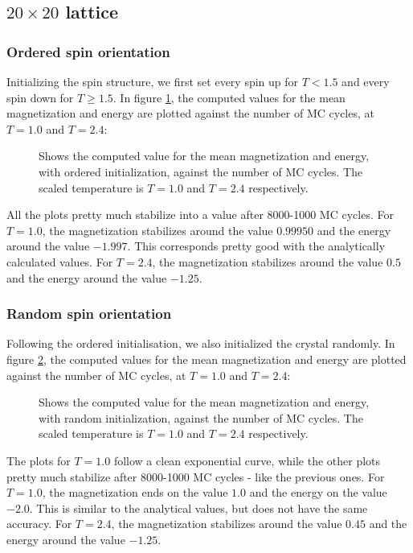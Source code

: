 \documentclass[../main.tex]{subfiles}
\begin{document}
\subsection{$20 \times 20$ lattice}
\subsubsection*{Ordered spin orientation}
Initializing the spin structure, we first set every spin up for $T<1.5$ and every spin down for $T\ge 1.5$. In figure \ref{fig:ordered}, the computed values for the mean magnetization and energy are plotted against the number of MC cycles, at $T=1.0$ and $T=2.4$:

\begin{figure}[!h]
  \centering
  \caption{Shows the computed value for the mean magnetization and energy, with ordered initialization, against the number of MC cycles. The scaled temperature is $T=1.0$ and $T=2.4$ respectively.}
  \label{fig:ordered}
\end{figure}
\FloatBarrier
All the plots pretty much stabilize into a value after 8000-1000 MC cycles. For $T=1.0$, the magnetization stabilizes around the value $0.99950$ and the energy around the value $-1.997$. This corresponds pretty good with the analytically calculated values. For $T=2.4$, the magnetization stabilizes around the value $0.5$ and the energy around the value $-1.25$.

\subsubsection*{Random spin orientation}
Following the ordered initialisation, we also initialized the crystal randomly. In figure \ref{fig:random}, the computed values for the mean magnetization and energy are plotted against the number of MC cycles, at $T=1.0$ and $T=2.4$:

\begin{figure}[!h]
  \centering
  \caption{Shows the computed value for the mean magnetization and energy, with random initialization, against the number of MC cycles. The scaled temperature is $T=1.0$ and $T=2.4$ respectively.}
  \label{fig:random}
\end{figure}
\FloatBarrier
The plots for $T=1.0$ follow a clean exponential curve, while the other plots pretty much stabilize after 8000-1000 MC cycles - like the previous ones. For $T=1.0$, the magnetization ends on the value $1.0$ and the energy on the value $-2.0$. This is similar to the analytical values, but does not have the same accuracy. For $T=2.4$, the magnetization stabilizes around the value $0.45$ and the energy around the value $-1.25$.
\end{document}
